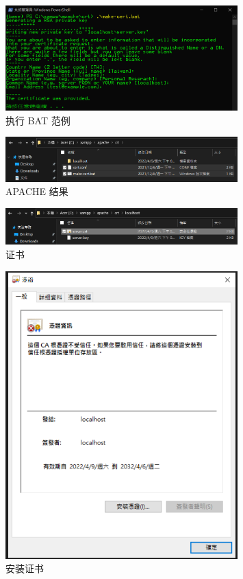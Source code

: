 \begin{figure}[htb]
\centering 
\includegraphics[width=0.80\textwidth]{img/ch1s2m4.png} 
\caption{执行 BAT 范例}
\label{Test}
\end{figure}

\begin{figure}[htb]
\centering 
\includegraphics[width=0.80\textwidth]{img/ch1s2m5.png} 
\caption{APACHE 结果}
\label{Test}
\end{figure}

\begin{figure}[htb]
\centering 
\includegraphics[width=0.80\textwidth]{img/ch1s2m6.png} 
\caption{证书}
\label{Test}
\end{figure}

\begin{figure}[htb]
\centering 
\includegraphics[width=0.80\textwidth]{img/ch1s2m7.png} 
\caption{安装证书}
\label{Test}
\end{figure}

